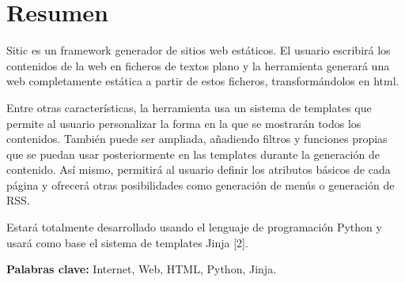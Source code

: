 \section*{Resumen}

Sitic es un framework generador de sitios web estáticos. El usuario escribirá
los contenidos de la web en ficheros de textos plano y la
herramienta generará una web completamente estática a partir de estos ficheros,
transformándolos en html.

Entre otras características, la herramienta usa un sistema de templates que permite al
usuario personalizar la forma en la que se mostrarán todos los contenidos. También puede
ser ampliada, añadiendo filtros y funciones propias que se puedan usar posteriormente en
las templates durante la generación de contenido. Así mismo, permitirá al usuario definir los
atributos básicos de cada página y ofrecerá otras posibilidades como generación de menús
o generación de RSS.

Estará totalmente desarrollado usando el lenguaje de programación Python y usará como
base el sistema de templates Jinja [2].

\textbf{Palabras clave:} Internet, Web, HTML, Python, Jinja.


